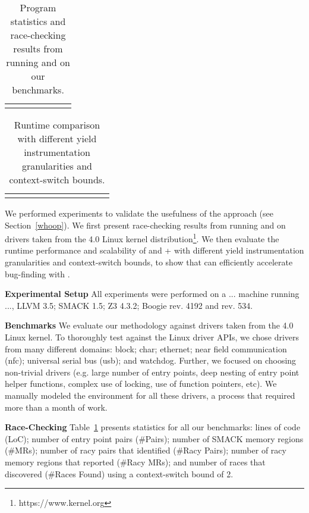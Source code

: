 \newcommand{\colspacing}{\hspace{1.8em}}
\begin{table}[t]
\small
\centering
\setlength{\tabcolsep}{0.3em}
\caption{Program statistics and race-checking results from running \whoop and \corral on our benchmarks.}
\label{tab:stats}
\begin{tabular}{l rrr rr r}
\centering

\end{tabular}
\end{table}

\begin{table*}[t]
\small
\centering
\caption{Runtime comparison with different yield instrumentation granularities and context-switch bounds.}
\label{tab:results}
\begin{tabular}{l rrr rrr rr r r}
\centering

\end{tabular}
\end{table*}

We performed experiments to validate the usefulness of the \whoop approach (see Section~\ref{whoop}). We first present race-checking results from running \whoop and \corral on \sizeOfBenchmarks drivers taken from the 4.0 Linux kernel distribution\footnote{https://www.kernel.org}. We then evaluate the runtime performance and scalability of \corral and \whoop + \corral with different yield instrumentation granularities and context-switch bounds, to show that \whoop can efficiently accelerate bug-finding with \corral.

\noindent
\textbf{Experimental Setup}\xspace\xspace All experiments were performed on a ... machine running ..., LLVM 3.5; SMACK 1.5; Z3 4.3.2; Boogie rev. 4192 and \corral rev. 534.

\noindent
\textbf{Benchmarks}\xspace\xspace We evaluate our methodology against \sizeOfBenchmarks drivers taken from the 4.0 Linux kernel. To thoroughly test \whoop against the Linux driver APIs, we chose drivers from many different domains: block; char; ethernet; near field communication (nfc); universal serial bus (usb); and watchdog. Further, we focused on choosing non-trivial drivers (e.g. large number of entry points, deep nesting of entry point helper functions, complex use of locking, use of function pointers, etc). We manually modeled the environment for all these drivers, a process that required more than a month of work.

\noindent
\textbf{Race-Checking}\xspace\xspace Table~\ref{tab:stats} presents statistics for all our benchmarks: lines of code (LoC); number of entry point pairs (\#Pairs); number of SMACK memory regions (\#MRs); number of racy pairs that \whoop identified (\#Racy Pairs); number of racy memory regions that \whoop reported (\#Racy MRs); and number of races that \corral discovered (\#Races Found) using a context-switch bound of 2.

